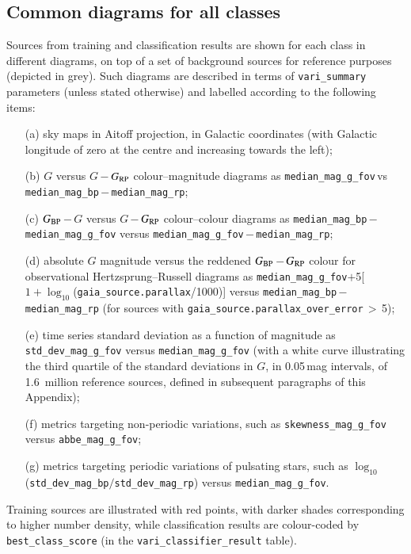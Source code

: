 \documentclass[longauth]{aa}
\def\g{$G$\xspace}
\def\bp{$G_{\rm BP}$\xspace}
\def\rp{$G_{\rm RP}$\xspace}
\begin{document}
\begin{appendix}
\section{Common diagrams for all classes\label{app:plots}}
Sources from training and classification results are shown for each class in different diagrams, on top of a set of background sources for reference purposes (depicted in grey). Such diagrams are described in terms of \texttt{vari\_summary} parameters (unless stated otherwise) and labelled according to the following items: 
\begin{itemize}
\item[(a)] sky maps in Aitoff projection, in Galactic coordinates (with Galactic longitude of zero at the centre and increasing towards the left); 
\item[(b)] \g versus \mbox{\g\,$-$\,\rp} colour--magnitude diagrams as \texttt{median\_mag\_g\_fov}\,vs\,\texttt{median\_mag\_bp}\,$-$\,\texttt{median\_mag\_rp};
\item[(c)] \mbox{\bp\,$-$\,\g} versus \mbox{\g\,$-$\,\rp} colour--colour diagrams as \texttt{median\_mag\_bp}\,$-$\,\texttt{median\_mag\_g\_fov} versus \texttt{median\_mag\_g\_fov}\,$-$\,\texttt{median\_mag\_rp};
\item[(d)] absolute \g magnitude versus the reddened \mbox{\bp\,$-$\,\rp} colour for observational Hertzsprung--Russell diagrams  as {\small \texttt{median\_mag\_g\_fov}$+$5[$1+\log_{10}$({\small\texttt{gaia\_source.parallax}}/1000)]} versus \texttt{median\_mag\_bp}\,$-$\,\texttt{median\_mag\_rp} (for sources with \texttt{gaia\_source.parallax\_over\_error}\,$>$\,5);
\item[(e)] time series standard deviation as a function of magnitude as \texttt{std\_dev\_mag\_g\_fov} versus \texttt{median\_mag\_g\_fov} (with a white curve illustrating the third quartile of the standard deviations in \g, in 0.05\,mag intervals, of 1.6~million reference sources, defined in subsequent paragraphs of this Appendix);
\item[(f)] metrics targeting non-periodic variations, such as \texttt{skewness\_mag\_g\_fov}
 versus \texttt{abbe\_mag\_g\_fov};
\item[(g)] metrics targeting periodic variations of pulsating stars, such as $\log_{10}$\,(\texttt{std\_dev\_mag\_bp}$/$\texttt{std\_dev\_mag\_rp}) versus \texttt{median\_mag\_g\_fov}. 
\end{itemize}
Training sources are illustrated with red points, with darker shades corresponding to higher number density, while classification results are colour-coded by \texttt{best\_class\_score} (in the \texttt{vari\_classifier\_result} table). 


\end{appendix}
\end{document}
